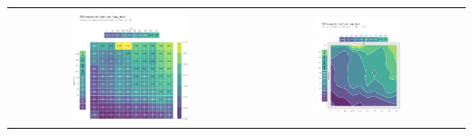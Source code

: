 \begin{tabular}{c|c}
	\arrayrulecolor[rgb]{0.8,0.85,1}
	\includegraphics*[width = 0.5\textwidth]{pics/mypdp7.png} & \includegraphics*[width = 0.42\textwidth]{pics/mypdp8.png}\\
\end{tabular}\\[2mm]